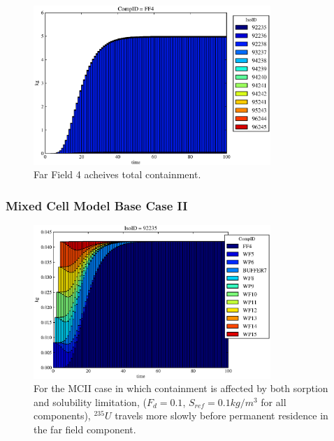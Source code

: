 \begin{frame}[ctb!]
\begin{figure}
\begin{minipage}[b]{0.45\linewidth}
  \includegraphics[width=0.8\textwidth]{./images/mcIII0.eps}
  \caption[Case MCI WP Contaminants.]{ 
    Far Field 4 acheives total containment.
    }
  \label{fig:mcII}


  \end{minipage}
\end{figure}

\end{frame}


\begin{frame}[ctb!]
  \frametitle{Mixed Cell Model Base Case II}
\begin{figure}[ht]
\centering
\includegraphics[width=0.8\textwidth]{./images/mcIII.eps}
\caption[$^{235}U$ residence. Mixed Cell Coupled Sorption and Solubility Limitation.]{
For the MCII case in which containment is affected by both sorption and 
solubility limitation,
($F_{d}=0.1$, $S_{ref}=0.1kg/m^3$ for all components), $^{235}U$ travels more slowly
before permanent residence in the far field component.
}
\label{fig:mcIIIall}
\end{figure}
\end{frame}

